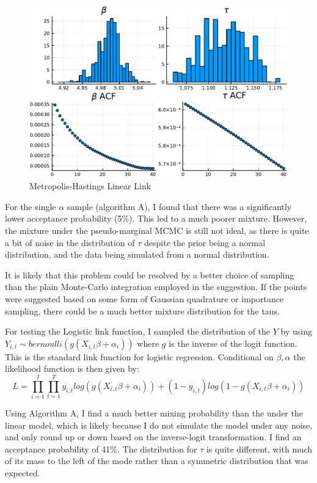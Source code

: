 \documentclass[12pt]{paper}
\begin{document}
\begin{figure}[h!]
  \includegraphics[width=.9\linewidth]{./Linear_A.pdf}
  \caption{Metropolis-Hastings Linear Link}
\end{figure}

For the single $\alpha$ sample (algorithm A), I found that there was a
significantly lower acceptance probability (5\%). This led to a much
poorer mixture. However, the mixture under the pseudo-marginal MCMC is
still not ideal, as there is quite a bit of noise in the distribution
of $\tau$ despite the prior being a normal distribution, and the data
being simulated from a normal distribution.

It is likely that this problem could be resolved by a better choice of
sampling than the plain Monte-Carlo integration employed in the
suggestion. If the points were suggested based on some form of
Gaussian quadrature or importance sampling, there could be a much
better mixture distribution for the taus.

For testing the Logistic link function, I sampled the distribution of
the $Y$ by using $Y_{i,t} \sim bernoulli( g( X_{i,t}\beta + \alpha_i))$ where $g$
is the inverse of the logit function. This is the standard link
function for logistic regression. Conditional on $\beta,\alpha$ the likelihood
function is then given by:
\begin{equation*}
  L = \prod_{i=1}^I \prod_{t=1}^T y_{i,t} log( g( X_{i,t}\beta + \alpha_i)) +
  (1-y_{i,t}) log( 1 - g(X_{i,t}\beta + \alpha_i))
\end{equation*} 

Using Algorithm A, I find a much better mixing probability than the
under the linear model, which is likely because I do not simulate the
model under any noise, and only round up or down based on the
inverse-logit transformation. I find an acceptance probability of
41\%. The distribution for $\tau$ is quite different, with much of its
mass to the left of the mode rather than a symmetric distribution that
was expected. 
\end{document}
